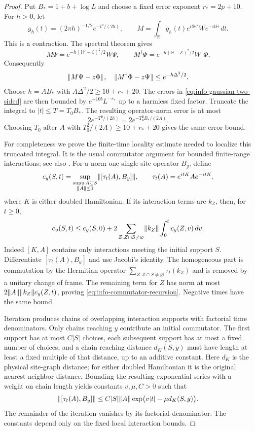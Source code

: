 \begin{proof}
Put $B_*=1+b+\log L$ and choose a fixed error exponent
$r_*=2p+10$.  For $h>0$, let
\[
 g_h(t)=(2\pi h)^{-1/2}e^{-t^2/(2h)},\qquad
 M=\int_{\mathbb R}g_h(t)e^{it\mathbb H'}W e^{-it\mathbb H}\,dt.
\]
This is a contraction.  The spectral theorem gives
\[
 M\Psi=e^{-h(\mathbb H'-\mathcal E)^2/2}W\Psi,
 \qquad
 M^\dagger\Phi=e^{-h(\mathbb H-\mathcal E)^2/2}W^\dagger\Phi.
\]
Consequently
\begin{equation}
 \lVert M\Psi-z\Phi\rVert,\quad\lVert M^\dagger\Phi-z\Psi\rVert
       \le e^{-h\Delta^2/2}.
 \label{eq:info-gaussian-two-sided}
\end{equation}
Choose $h=A B_*$ with $A\Delta^2/2\ge10+r_*+20$.  The errors in
\eqref{eq:info-gaussian-two-sided} are then bounded by
$e^{-10b}L^{-r_*}$ up to a harmless fixed factor.  Truncate the integral
to $|t|\le T=T_0B_*$.  The resulting operator-norm error is at most
\[
 2e^{-T^2/(2h)}=2e^{-T_0^2 B_*/(2A)}.
\]
Choosing $T_0$ after $A$ with $T_0^2/(2A)\ge10+r_*+20$ gives the
same error bound.

For completeness we prove the finite-time locality estimate needed
to localize this truncated integral.  It is the usual commutator
argument for bounded finite-range interactions; see also
\cite{NachtergaeleOgataSims2006}.  For a norm-one single-site operator
$B_y$, define
\[
 c_y(S,t)=\sup_{\substack{\operatorname{supp} A\subseteq S\\\lVert A\rVert\le1}}
                  \lVert [\tau_t(A),B_y]\rVert,
 \qquad \tau_t(A)=e^{itK}Ae^{-itK},
\]
where $K$ is either doubled Hamiltonian.  If its interaction terms are
$k_Z$, then, for $t\ge0$,
\begin{equation}
 c_y(S,t)\le c_y(S,0)+
 2\sum_{Z:Z\cap S\ne\varnothing}\lVert k_Z\rVert
                      \int_0^t c_y(Z,v)\,dv.
 \label{eq:info-commutator-recursion}
\end{equation}
Indeed $[K,A]$ contains only interactions meeting the initial support
$S$.  Differentiate $[\tau_t(A),B_y]$ and use Jacobi's identity.
The homogeneous part is commutation by the Hermitian operator
$\sum_{Z:Z\cap S\ne\varnothing}\tau_t(k_Z)$ and is removed by a
unitary change of frame.  The remaining term for $Z$ has norm at most
$2\lVert A\rVert\lVert k_Z\rVert c_y(Z,t)$, proving
\eqref{eq:info-commutator-recursion}.  Negative times have the same
bound.

Iteration produces chains of overlapping interaction supports with
factorial time denominators.  Only chains reaching $y$ contribute an
initial commutator.  The first support has at most $C|S|$ choices,
each subsequent support has at most a fixed number of choices, and a
chain reaching distance $d_K(S,y)$ must have length at least a fixed
multiple of that distance, up to an additive constant.  Here $d_K$
is the physical site-graph distance; for either doubled Hamiltonian
it is the original nearest-neighbor distance.  Bounding the resulting
exponential series with a weight on chain length yields constants
$v,\mu,C>0$ such that
\begin{equation}
 \lVert [\tau_t(A),B_y]\rVert
       \le C|S|\lVert A\rVert\exp\bigl(v|t|-\mu d_K(S,y)\bigr).
 \label{eq:info-lr}
\end{equation}
The remainder of the iteration vanishes by its factorial denominator.
The constants depend only on the fixed local interaction bounds.


\end{proof}
